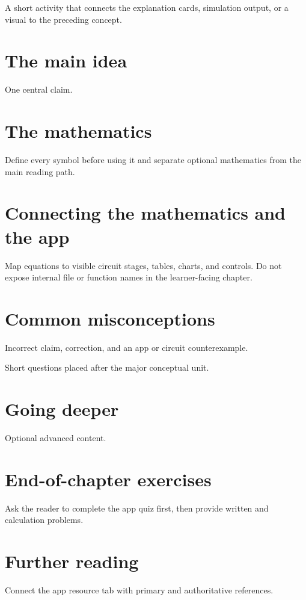 \begin{appactivity}
A short activity that connects the explanation cards, simulation output, or a visual to the preceding concept.
\end{appactivity}

\section{The main idea}
\begin{coreidea}
One central claim.
\end{coreidea}

\section{The mathematics}
Define every symbol before using it and separate optional mathematics from the main reading path.

\section{Connecting the mathematics and the app}
Map equations to visible circuit stages, tables, charts, and controls. Do not expose internal file or function names in the learner-facing chapter.

\section{Common misconceptions}
\begin{misconception}
Incorrect claim, correction, and an app or circuit counterexample.
\end{misconception}

\begin{checkpoint}
Short questions placed after the major conceptual unit.
\end{checkpoint}

\section{Going deeper}
\begin{goingdeeper}
Optional advanced content.
\end{goingdeeper}

\section{End-of-chapter exercises}
Ask the reader to complete the app quiz first, then provide written and calculation problems.

\section{Further reading}
Connect the app resource tab with primary and authoritative references.

